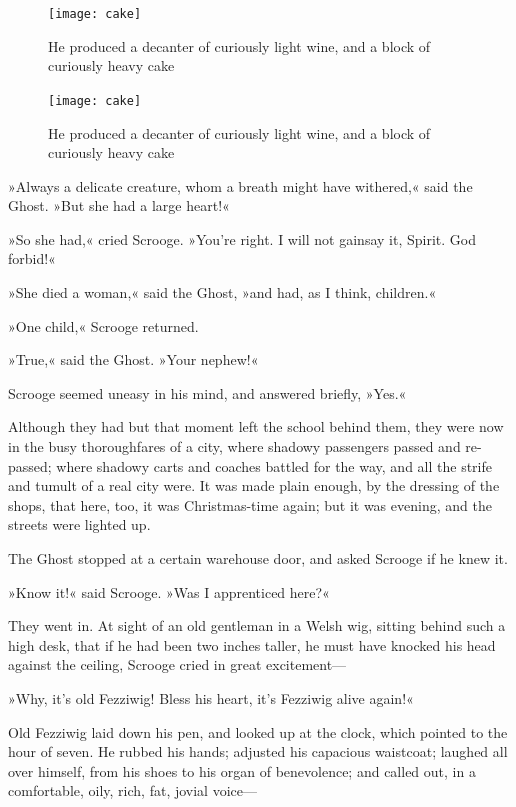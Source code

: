 \makeatletter
{}
{%
	\begin{figure}[tbph]
		\centering
		\texttt{[image: cake]}
		\caption[A decanter of curiously light wine]{He produced a decanter of curiously light wine, and a block of curiously heavy cake}
	\end{figure}
}{%
	\begin{figure}[tbph]
		\centering
		\texttt{[image: cake]}
		\caption[A decanter of curiously light wine]{He produced a decanter of curiously light wine, and a block of curiously heavy cake}
	\end{figure}
}
\makeatother


»Always a delicate creature, whom a breath might have withered,« said the Ghost. »But she had a large heart!«

»So she had,« cried Scrooge. »You're right. I will not gainsay it, Spirit. God forbid!«

»She died a woman,« said the Ghost, »and had, as I think, children.«

»One child,« Scrooge returned.

»True,« said the Ghost. »Your nephew!«

Scrooge seemed uneasy in his mind, and answered briefly, »Yes.«

Although they had but that moment left the school behind them, they were now in the busy thoroughfares of a city, where shadowy passengers passed and re-passed; where shadowy carts and coaches battled for the way, and all the strife and tumult of a real city were. It was made plain enough, by the dressing of the shops, that here, too, it was Christmas-time again; but it was evening, and the streets were lighted up.

The Ghost stopped at a certain warehouse door, and asked Scrooge if he knew it.

»Know it!« said Scrooge. »Was I apprenticed here?«

They went in. At sight of an old gentleman in a Welsh wig, sitting behind such a high desk, that if he had been two inches taller, he must have knocked his head against the ceiling, Scrooge cried in great excitement— 

»Why, it's old Fezziwig! Bless his heart, it's Fezziwig alive again!«

Old Fezziwig laid down his pen, and looked up at the clock, which pointed to the hour of seven. He rubbed his hands; adjusted his capacious waistcoat; laughed all over himself, from his shoes to his organ of benevolence; and called out, in a comfortable, oily, rich, fat, jovial voice— 

